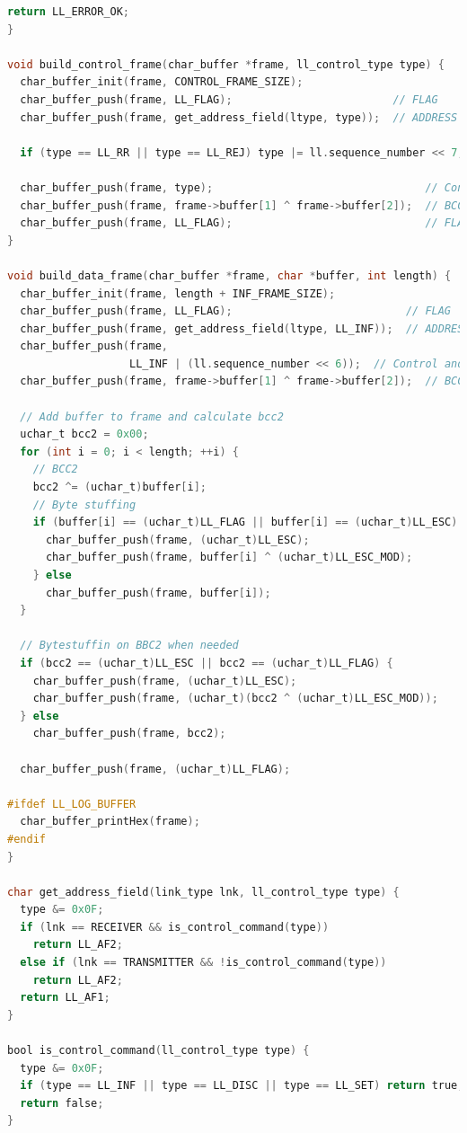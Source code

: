 \documentclass[11pt]{article}
\begin{document}
\begin{lstlisting}[language=C]
  return LL_ERROR_OK;
}

void build_control_frame(char_buffer *frame, ll_control_type type) {
  char_buffer_init(frame, CONTROL_FRAME_SIZE);
  char_buffer_push(frame, LL_FLAG);                         // FLAG
  char_buffer_push(frame, get_address_field(ltype, type));  // ADDRESS

  if (type == LL_RR || type == LL_REJ) type |= ll.sequence_number << 7;  // N(r)

  char_buffer_push(frame, type);                                 // Control type
  char_buffer_push(frame, frame->buffer[1] ^ frame->buffer[2]);  // BCC1
  char_buffer_push(frame, LL_FLAG);                              // FLAG
}

void build_data_frame(char_buffer *frame, char *buffer, int length) {
  char_buffer_init(frame, length + INF_FRAME_SIZE);
  char_buffer_push(frame, LL_FLAG);                           // FLAG
  char_buffer_push(frame, get_address_field(ltype, LL_INF));  // ADDRESS
  char_buffer_push(frame,
                   LL_INF | (ll.sequence_number << 6));  // Control and N(s)
  char_buffer_push(frame, frame->buffer[1] ^ frame->buffer[2]);  // BCC1

  // Add buffer to frame and calculate bcc2
  uchar_t bcc2 = 0x00;
  for (int i = 0; i < length; ++i) {
    // BCC2
    bcc2 ^= (uchar_t)buffer[i];
    // Byte stuffing
    if (buffer[i] == (uchar_t)LL_FLAG || buffer[i] == (uchar_t)LL_ESC) {
      char_buffer_push(frame, (uchar_t)LL_ESC);
      char_buffer_push(frame, buffer[i] ^ (uchar_t)LL_ESC_MOD);
    } else
      char_buffer_push(frame, buffer[i]);
  }

  // Bytestuffin on BBC2 when needed
  if (bcc2 == (uchar_t)LL_ESC || bcc2 == (uchar_t)LL_FLAG) {
    char_buffer_push(frame, (uchar_t)LL_ESC);
    char_buffer_push(frame, (uchar_t)(bcc2 ^ (uchar_t)LL_ESC_MOD));
  } else
    char_buffer_push(frame, bcc2);

  char_buffer_push(frame, (uchar_t)LL_FLAG);

#ifdef LL_LOG_BUFFER
  char_buffer_printHex(frame);
#endif
}

char get_address_field(link_type lnk, ll_control_type type) {
  type &= 0x0F;
  if (lnk == RECEIVER && is_control_command(type))
    return LL_AF2;
  else if (lnk == TRANSMITTER && !is_control_command(type))
    return LL_AF2;
  return LL_AF1;
}

bool is_control_command(ll_control_type type) {
  type &= 0x0F;
  if (type == LL_INF || type == LL_DISC || type == LL_SET) return true;
  return false;
}


\end{lstlisting}
\end{document}
